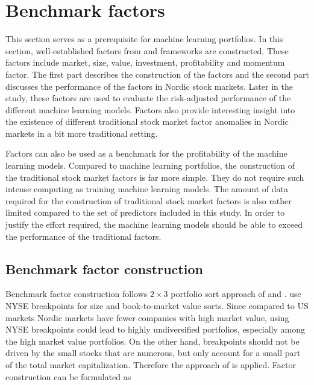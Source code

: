 \documentclass[12pt]{article}
\begin{document}
\section{Benchmark factors} \label{BenchmarkFactors}

This section serves as a prerequisite for machine learning portfolios. In this section, well-established factors from \citet{Carhart1997} and \citet{FAMA20151} frameworks are constructed. These factors include market, size, value, investment, profitability and momentum factor.\footnotemark {} The first part describes the construction of the factors and the second part discusses the performance of the factors in Nordic stock markets. Later in the study, these factors are used to evaluate the risk-adjusted performance of the different machine learning models. Factors also provide interesting insight into the existence of different traditional stock market factor anomalies in Nordic markets in a bit more traditional setting. \par

Factors can also be used as a benchmark for the profitability of the machine learning models. Compared to machine learning portfolios, the construction of the traditional stock market factors is far more simple. They do not require such intense computing as training machine learning models. The amount of data required for the construction of traditional stock market factors is also rather limited compared to the set of predictors included in this study. In order to justify the effort required, the machine learning models should be able to exceed the performance of the traditional factors.\par

\subsection{Benchmark factor construction}\label{BenchmarkFactorsConstruction}

Benchmark factor construction follows $2 \times 3$ portfolio sort approach of \citet{FAMA19933, FAMA20151} and \citet{Carhart1997}. \citet{FAMA19933} use NYSE breakpoints for size and book-to-market value sorts.\footnotemark {}  Since compared to US markets Nordic markets have fewer companies with high market value, using NYSE breakpoints could lead to highly undiversified portfolios, especially among the high market value portfolios. On the other hand, breakpoints should not be driven by the small stocks that are numerous, but only account for a small part of the total market capitalization. Therefore the approach of \citet{FAMA2012457} is applied. Factor construction can be formulated as \par
\end{document}
